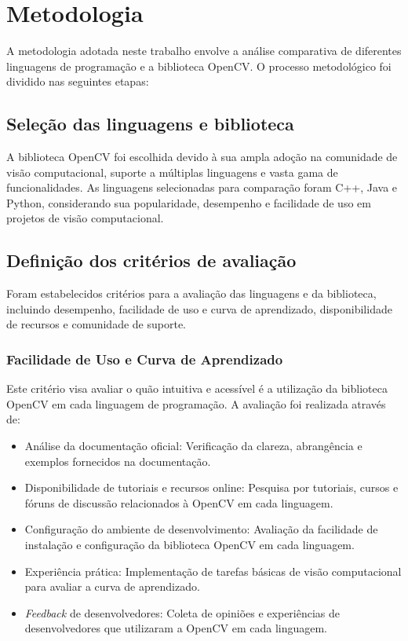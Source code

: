 \section{Metodologia}
A metodologia adotada neste trabalho envolve a análise comparativa de diferentes linguagens de programação e a biblioteca OpenCV. O processo metodológico foi dividido nas seguintes etapas:

\subsection{Seleção das linguagens e biblioteca}

A biblioteca OpenCV foi escolhida devido à sua ampla adoção na comunidade de visão computacional, suporte a múltiplas linguagens e vasta gama de funcionalidades. As linguagens selecionadas para comparação foram C++, Java e Python, considerando sua popularidade, desempenho e facilidade de uso em projetos de visão computacional.

\subsection{Definição dos critérios de avaliação}

Foram estabelecidos critérios para a avaliação das linguagens e da biblioteca, incluindo desempenho, facilidade de uso e curva de aprendizado, disponibilidade de recursos e comunidade de suporte.

\subsubsection{Facilidade de Uso e Curva de Aprendizado}
Este critério visa avaliar o quão intuitiva e acessível é a utilização da biblioteca OpenCV em cada linguagem de programação. A avaliação foi realizada através de:
\begin{itemize}
    \item Análise da documentação oficial: Verificação da clareza, abrangência e exemplos fornecidos na documentação.
    \item Disponibilidade de tutoriais e recursos online: Pesquisa por tutoriais, cursos e fóruns de discussão relacionados à OpenCV em cada linguagem.
    \item Configuração do ambiente de desenvolvimento: Avaliação da facilidade de instalação e configuração da biblioteca OpenCV em cada linguagem.
    \item Experiência prática: Implementação de tarefas básicas de visão computacional para avaliar a curva de aprendizado.
    \item \textit{Feedback} de desenvolvedores: Coleta de opiniões e experiências de desenvolvedores que utilizaram a OpenCV em cada linguagem.
\end{itemize}

